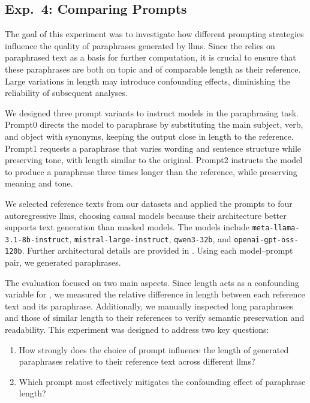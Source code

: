 \subsection{Exp.\ 4: Comparing Prompts}
\label{subsec:prompt_impact_setup}

The goal of this experiment was to investigate how different prompting strategies influence the quality of paraphrases generated by \acp{llm}.  
Since the \impAppr{} relies on paraphrased text as a basis for further computation, it is crucial to ensure that these paraphrases are both on topic and of comparable length as their reference.  
Large variations in length may introduce confounding effects, diminishing the reliability of subsequent analyses.

We designed three prompt variants to instruct models in the paraphrasing task.
Prompt0 directs the model to paraphrase by substituting the main subject, verb, and object with synonyms, keeping the output close in length to the reference.  
Prompt1 requests a paraphrase that varies wording and sentence structure while preserving tone, with length similar to the original.  
Prompt2 instructs the model to produce a paraphrase three times longer than the reference, while preserving meaning and tone. 

We selected reference texts from our datasets and applied the prompts to four autoregressive \acp{llm}, choosing causal models because their architecture better supports text generation than masked models. 
The models include \texttt{meta-llama-3.1-8b-instruct}, \texttt{mistral-large-instruct}, \texttt{qwen3-32b}, and \texttt{openai-gpt-oss-120b}.
Further architectural details are provided in . 
Using each model–prompt pair, we generated paraphrases.

The evaluation focused on two main aspects. 
Since length acts as a confounding variable for \imps{}, we measured the relative difference in length between each reference text and its paraphrase. 
Additionally, we manually inspected long paraphrases and those of similar length to their references to verify semantic preservation and readability.
This experiment was designed to address two key questions:
\begin{enumerate}
\item How strongly does the choice of prompt influence the length of generated paraphrases relative to their reference text across different \acp{llm}?
\item Which prompt most effectively mitigates the confounding effect of paraphrase length?
\end{enumerate}
